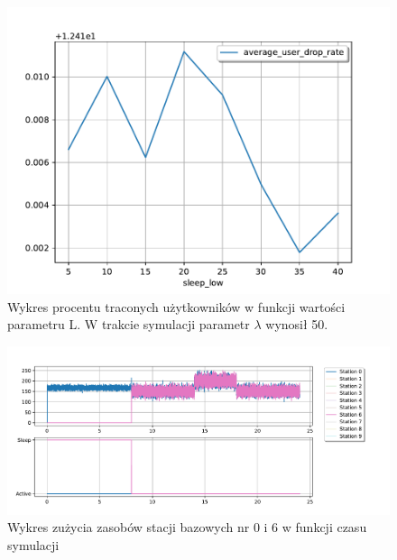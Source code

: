 \begin{figure}[h!]
\center
\includegraphics[scale=0.65]{img/drop_rate_lambda_50.pdf} 
\caption{Wykres procentu traconych użytkowników w funkcji wartości parametru L. W trakcie symulacji parametr $\lambda$ wynosił 50.}
\label{dropped_users_iter_l3}
\end{figure}

\begin{figure}[h!]
\center
\includegraphics[scale=0.65]{img/usage_over_time.pdf} 
\caption{Wykres zużycia zasobów stacji bazowych nr 0 i 6 w funkcji czasu symulacji}
\label{usage_over_time}
\end{figure}

\newpage\newpage
